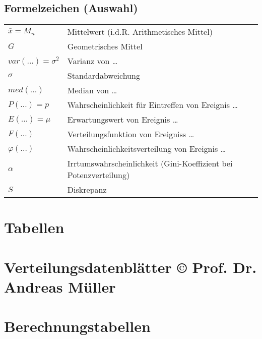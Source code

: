 \documentclass[margin=normal]{tex/hsrzf}
\begin{document}
\subsection{Formelzeichen (Auswahl)}
\begin{tabular}{ll}


    $\bar{x} = M_n$         & Mittelwert (i.d.R. Arithmetisches Mittel)                         \\
    $G$                     & Geometrisches Mittel                                              \\
    $var(\dots) = \sigma^2$ & Varianz von \dots                                                 \\
    $\sigma$                & Standardabweichung                                                \\
    $med(\dots)$            & Median von \dots                                                  \\
    $P(\dots) = p $         & Wahrscheinlichkeit für Eintreffen von Ereignis \dots              \\
    $E(\dots) = \mu$        & Erwartungswert von Ereignis \dots                                 \\
    $F(\dots)$              & Verteilungsfunktion von Ereigniss \dots                           \\
    $\varphi(\dots)$        & Wahrscheinlichkeitsverteilung von Ereignis \dots                  \\
    $\alpha$                & Irrtumswahrscheinlichkeit (Gini-Koeffizient bei Potenzverteilung) \\
    $S$                     & Diskrepanz
\end{tabular}

\newpage


\newpage
\section{Tabellen}








\section{Verteilungsdatenblätter ©	Prof. Dr. Andreas Müller}


\section{Berechnungstabellen}


\newpage\null\thispagestyle{empty}\addtocounter{page}{-1}\newpage %



\end{document}
